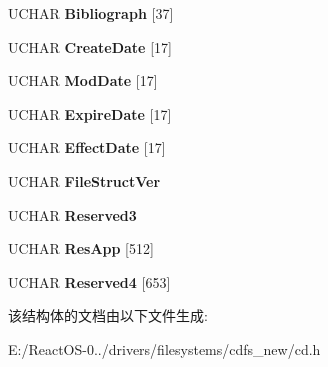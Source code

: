 \begin{DoxyCompactItemize}
U\+C\+H\+AR {\bfseries Bibliograph} \mbox{[}37\mbox{]}
\item 
\mbox{\label{struct___r_a_w___j_o_l_i_e_t___v_d_a3c12467ef1e4eb7f034ac0073ad65da0}} 
U\+C\+H\+AR {\bfseries Create\+Date} \mbox{[}17\mbox{]}
\item 
\mbox{\label{struct___r_a_w___j_o_l_i_e_t___v_d_a2a0828c406f10b3eb58d9f5d43ebaa12}} 
U\+C\+H\+AR {\bfseries Mod\+Date} \mbox{[}17\mbox{]}
\item 
\mbox{\label{struct___r_a_w___j_o_l_i_e_t___v_d_af2c61c9ff7415fd2383f7d92d22b6f6d}} 
U\+C\+H\+AR {\bfseries Expire\+Date} \mbox{[}17\mbox{]}
\item 
\mbox{\label{struct___r_a_w___j_o_l_i_e_t___v_d_ac9155e751fd5988bb5d7fd9594679f1e}} 
U\+C\+H\+AR {\bfseries Effect\+Date} \mbox{[}17\mbox{]}
\item 
\mbox{\label{struct___r_a_w___j_o_l_i_e_t___v_d_a7656815595cfab78ddf8323f37b47553}} 
U\+C\+H\+AR {\bfseries File\+Struct\+Ver}
\item 
\mbox{\label{struct___r_a_w___j_o_l_i_e_t___v_d_aca05eb677bf169cd39c435024fb6bb08}} 
U\+C\+H\+AR {\bfseries Reserved3}
\item 
\mbox{\label{struct___r_a_w___j_o_l_i_e_t___v_d_a4c0ce19666905b0222cb8f57ac19b0a0}} 
U\+C\+H\+AR {\bfseries Res\+App} \mbox{[}512\mbox{]}
\item 
\mbox{\label{struct___r_a_w___j_o_l_i_e_t___v_d_a3885be90613014ae19b5b850cd00ff14}} 
U\+C\+H\+AR {\bfseries Reserved4} \mbox{[}653\mbox{]}
\end{DoxyCompactItemize}


该结构体的文档由以下文件生成\+:\begin{DoxyCompactItemize}
\item 
E\+:/\+React\+O\+S-\/0../drivers/filesystems/cdfs\+\_\+new/cd.\+h\end{DoxyCompactItemize}
